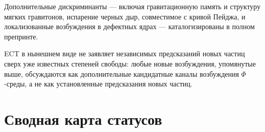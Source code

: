 \documentclass[11pt,a4paper]{article}
\begin{document}
Дополнительные дискриминанты — включая гравитационную память и
структуру мягких гравитонов, испарение черных дыр, совместимое с
кривой Пейджа, и локализованные возбуждения в дефектных ядрах —
каталогизированы в полном препринте.

ECT в нынешнем виде не заявляет независимых предсказаний новых
частиц сверх уже известных степеней свободы: любые новые возбуждения,
упомянутые выше, обсуждаются как дополнительные кандидатные
каналы возбуждения $\Phi$-среды, а не как установленные
предсказания новых частиц.

\section{Сводная карта статусов}
\label{sec:status_map}
\end{document}
